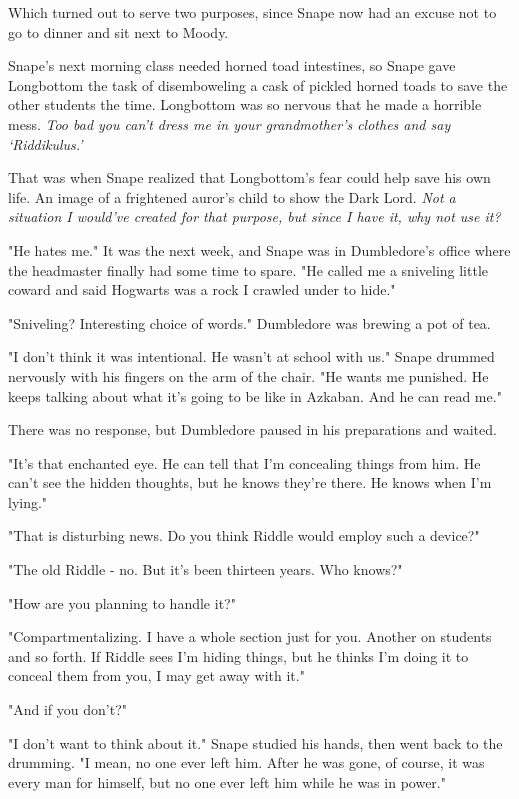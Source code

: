 Which turned out to serve two purposes, since Snape now had an excuse not to go to dinner and sit next to Moody.

Snape's next morning class needed horned toad intestines, so Snape gave Longbottom the task of disemboweling a cask of pickled horned toads to save the other students the time. Longbottom was so nervous that he made a horrible mess. \emph{Too bad you can't dress me in your grandmother's clothes and say `Riddikulus.'}

That was when Snape realized that Longbottom's fear could help save his own life. An image of a frightened auror's child to show the Dark Lord. \emph{Not a situation I would've created for that purpose, but since I have it, why not use it?}

"He hates me." It was the next week, and Snape was in Dumbledore's office where the headmaster finally had some time to spare. "He called me a sniveling little coward and said Hogwarts was a rock I crawled under to hide."

"Sniveling? Interesting choice of words." Dumbledore was brewing a pot of tea.

"I don't think it was intentional. He wasn't at school with us." Snape drummed nervously with his fingers on the arm of the chair. "He wants me punished. He keeps talking about what it's going to be like in Azkaban. And he can read me."

There was no response, but Dumbledore paused in his preparations and waited.

"It's that enchanted eye. He can tell that I'm concealing things from him. He can't see the hidden thoughts, but he knows they're there. He knows when I'm lying."

"That is disturbing news. Do you think Riddle would employ such a device?"

"The old Riddle - no. But it's been thirteen years. Who knows?"

"How are you planning to handle it?"

"Compartmentalizing. I have a whole section just for you. Another on students and so forth. If Riddle sees I'm hiding things, but he thinks I'm doing it to conceal them from you, I may get away with it."

"And if you don't?"

"I don't want to think about it." Snape studied his hands, then went back to the drumming. "I mean, no one ever left him. After he was gone, of course, it was every man for himself, but no one ever left him while he was in power."

